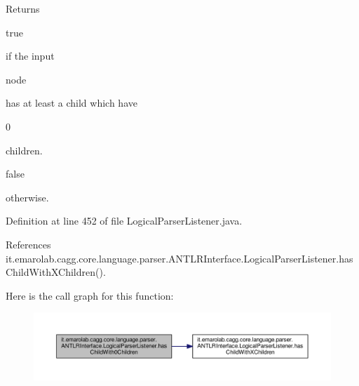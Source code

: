 \begin{DoxyReturn}{Returns}

\begin{DoxyCode}
\textcolor{keyword}{true} 
\end{DoxyCode}
 if the input
\begin{DoxyCode}
node 
\end{DoxyCode}
 has at least a child which have
\begin{DoxyCode}
0 
\end{DoxyCode}
 children.
\begin{DoxyCode}
\textcolor{keyword}{false} 
\end{DoxyCode}
 otherwise. 
\end{DoxyReturn}


Definition at line 452 of file Logical\-Parser\-Listener.\-java.



References it.\-emarolab.\-cagg.\-core.\-language.\-parser.\-A\-N\-T\-L\-R\-Interface.\-Logical\-Parser\-Listener.\-has\-Child\-With\-X\-Children().



Here is the call graph for this function\-:\nopagebreak
\begin{figure}[H]
\begin{center}
\leavevmode
\includegraphics[width=350pt]{classit_1_1emarolab_1_1cagg_1_1core_1_1language_1_1parser_1_1ANTLRInterface_1_1LogicalParserListener_ae0a5f8b7f8fcd41e3e8baf7ebb4ee66c_cgraph}
\end{center}
\end{figure}


